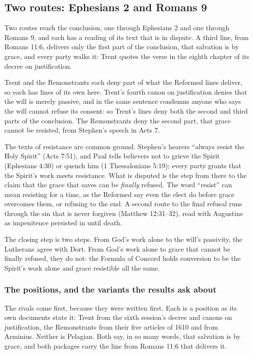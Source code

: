 \documentclass[11pt]{article}
\begin{document}
\subsection*{Two routes: Ephesians 2 and Romans 9}
Two routes reach the conclusion, one through Ephesians 2 and one through Romans 9, and each has a reading of its text that is in dispute. A third line, from Romans 11:6, delivers only the first part of the conclusion, that salvation is by grace, and every party walks it: Trent quotes the verse in the eighth chapter of its decree on justification.

Trent and the Remonstrants each deny part of what the Reformed lines deliver, so each has lines of its own here. Trent’s fourth canon on justification denies that the will is merely passive, and in the same sentence condemns anyone who says the will cannot refuse its consent: so Trent’s lines deny both the second and third parts of the conclusion. The Remonstrants deny the second part, that grace cannot be resisted, from Stephen’s speech in Acts 7.

The texts of resistance are common ground. Stephen’s hearers “always resist the Holy Spirit” (Acts 7:51), and Paul tells believers not to grieve the Spirit (Ephesians 4:30) or quench him (1 Thessalonians 5:19); every party grants that the Spirit’s work meets resistance. What is disputed is the step from there to the claim that the grace that saves can be \emph{finally} refused. The word “resist” can mean resisting for a time, as the Reformed say even the elect do before grace overcomes them, or refusing to the end. A second route to the final refusal runs through the sin that is never forgiven (Matthew 12:31–32), read with Augustine as impenitence persisted in until death.

The closing step is two steps. From God’s work alone to the will’s passivity, the Lutherans agree with Dort. From God’s work alone to grace that cannot be finally refused, they do not: the Formula of Concord holds conversion to be the Spirit’s work alone and grace resistible all the same.

\subsubsection*{The positions, and the variants the results ask about}
The rivals come first, because they were written first. Each is a position as its own documents state it: Trent from the sixth session’s decree and canons on justification, the Remonstrants from their five articles of 1610 and from Arminius. Neither is Pelagian. Both say, in so many words, that salvation is by grace, and both packages carry the line from Romans 11:6 that delivers it.
\end{document}
